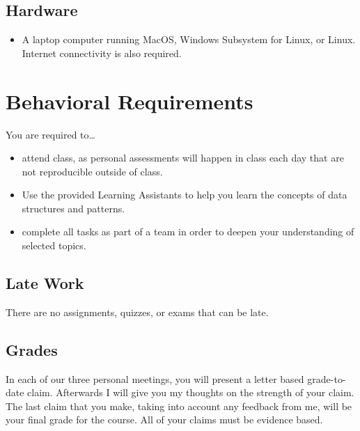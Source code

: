 \documentclass[12pt]{amsart}
\begin{document}
\subsection{Hardware}
	\begin{itemize}
		\item A laptop computer running MacOS, Windows Subsystem for Linux, or Linux. Internet connectivity is also required.
	\end{itemize}
\section{Behavioral Requirements}

You are required to\ldots
\begin{itemize}
\item attend class, as personal assessments will happen in class each day that are not reproducible outside of class.
\item Use the provided Learning Assistants to help you learn the concepts of data structures and patterns.
\item complete all tasks as part of a team in order to deepen your understanding of selected topics.
\end{itemize}

\subsection{Late Work} There are no assignments, quizzes, or exams that can be late.

\subsection{Grades} In each of our three personal meetings, you will present a letter based grade-to-date claim. Afterwards I will give you my thoughts on the strength of your claim. The last claim that you make, taking into account any feedback from me, will be your final grade for the course. All of your claims must be evidence based.
\end{document}
